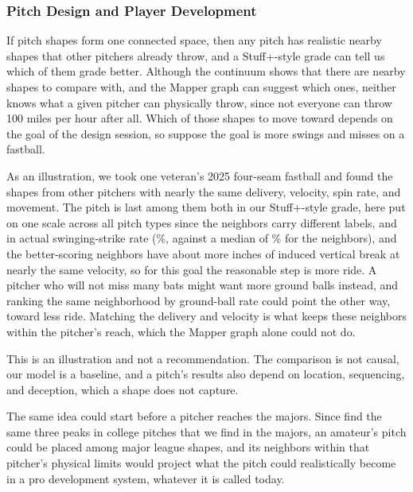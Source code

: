 \documentclass[11pt]{article}
\theoremstyle{definition}
\theoremstyle{remark}
\begin{document}
\subsubsection{Pitch Design and Player Development}
If pitch shapes form one connected space, then any pitch has realistic nearby shapes that other pitchers already throw, and a Stuff+-style grade can tell us which of them grade better.
Although the continuum shows that there are nearby shapes to compare with, and the Mapper graph can suggest which ones, neither knows what a given pitcher can physically throw, since not everyone can throw 100 miles per hour after all.
Which of those shapes to move toward depends on the goal of the design session, so suppose the goal is more swings and misses on a fastball.

As an illustration, we took one veteran's 2025 four-seam fastball and found the \DesignNeighbors{} shapes from other pitchers with nearly the same delivery, velocity, spin rate, and movement.
The pitch is last among them both in our Stuff+-style grade, here put on one scale across all pitch types since the neighbors carry different labels, and in actual swinging-strike rate (\DesignSwStr\%, against a median of \DesignNbSwStr\% for the neighbors), and the better-scoring neighbors have about \DesignIVBGain{} more inches of induced vertical break at nearly the same velocity, so for this goal the reasonable step is more ride.
A pitcher who will not miss many bats might want more ground balls instead, and ranking the same neighborhood by ground-ball rate could point the other way, toward less ride.
Matching the delivery and velocity is what keeps these neighbors within the pitcher's reach, which the Mapper graph alone could not do.

This is an illustration and not a recommendation. The comparison is not causal, our model is a baseline, and a pitch's results also depend on location, sequencing, and deception, which a shape does not capture.

The same idea could start before a pitcher reaches the majors.
Since \textcite{maloof2026classify} find the same three peaks in college pitches that we find in the majors, an amateur's pitch could be placed among major league shapes, and its neighbors within that pitcher's physical limits would project what the pitch could realistically become in a pro development system, whatever it is called today.
\end{document}
